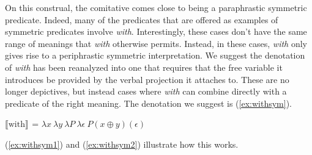 \documentclass[twoside, 12pt]{article}
\newcommand{\denotes}[2][]{\ensuremath{\llbracket \text{#2}\rrbracket^{#1}}}
\begin{document}
On this construal, the comitative comes close to being a paraphrastic symmetric predicate. Indeed, many of the predicates that are offered as examples of symmetric predicates involve \textit{with}. Interestingly, these cases don't have the same range of meanings that \textit{with} otherwise permits. Instead, in these cases, \textit{with} only gives rise to a periphrastic symmetric interpretation. We suggest the denotation of \textit{with} has been reanalyzed into one that requires that the free variable it introduces be provided by the verbal projection it attaches to. These are no longer depictives, but instead cases where \textit{with} can combine directly with a predicate of the right meaning. The denotation we suggest is (\ref{ex:withsym}).
\begin{exe}
\raggedright
  \ex \label{ex:withsym} \denotes{with} = $\lambda x\ \lambda y\ \lambda P\ \lambda \epsilon\ P(x \oplus y)(\epsilon)$
\end{exe}
(\ref{ex:withsym1}) and (\ref{ex:withsym2}) illustrate how this works.
\pagebreak
\end{document}
